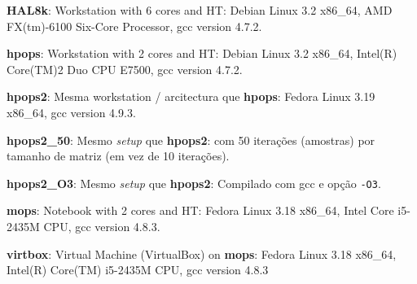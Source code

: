 \textbf{HAL8k}: Workstation with 6 cores and HT: Debian Linux 3.2 x86\_64, AMD FX(tm)-6100 Six-Core Processor, gcc version 4.7.2.


\textbf{hpops}: Workstation with 2 cores and HT: Debian Linux 3.2 x86\_64, Intel(R) Core(TM)2 Duo CPU E7500, gcc version 4.7.2.


\textbf{hpops2}: Mesma workstation / arcitectura que \textbf{hpops}: Fedora Linux 3.19 x86\_64, gcc version 4.9.3.


\textbf{hpops2\_50}: Mesmo \textit{setup} que \textbf{hpops2}: com 50 iterações (amostras) por tamanho de matriz (em vez de 10 iterações).


\textbf{hpops2\_O3}: Mesmo \textit{setup} que \textbf{hpops2}: Compilado com gcc e opção \texttt{-O3}.


\textbf{mops}: Notebook with 2 cores and HT: Fedora Linux 3.18 x86\_64, Intel Core i5-2435M CPU, gcc version 4.8.3.


\textbf{virtbox}: Virtual Machine (VirtualBox) on \textbf{mops}: Fedora Linux 3.18 x86\_64, Intel(R) Core(TM) i5-2435M CPU, gcc version 4.8.3


